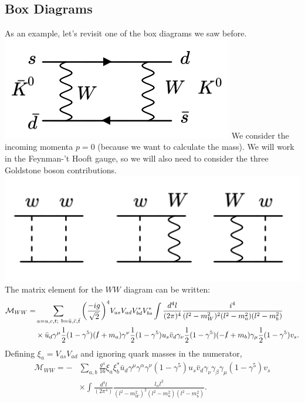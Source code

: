 \subsection{Box Diagrams}
%
As an example, let's revisit one of the box diagrams we saw before.
\newline
  \includegraphics[width=0.6\linewidth]{figs/49c.png}
\newline
We consider the incoming momenta $p=0$ (because we want to calculate the mass). We will work in the Feynman-'t Hooft gauge, so we will also need to consider the three Goldstone boson contributions.
\newline
  \includegraphics[width=0.6\linewidth]{figs/51a.png}
\newline
The matrix element for the $WW$ diagram can be written:
\begin{equation}
\begin{split}
\mathcal{M}_{WW} = &\sum_{a=u,c,t;\ b=\bar{u},\bar{c},\bar{t}} \bigg(\frac{-ig}{\sqrt{2}}\bigg)^4 V_{as}V_{ad} V^*_{bd}V^*_{bs} \int \frac{d^4l}{(2\pi)^4}\frac{i^4}{(l^2-m_W^2)^2(l^2-m_a^2)(l^2-m_b^2)} \\
&\times \bar{u}_d \gamma^\mu\frac{1}{2}(1-\gamma^5)(\slashed{l}+m_a)\gamma^\nu \frac{1}{2}(1-\gamma^5) u_s \bar{v}_d \gamma_\nu \frac{1}{2}(1-\gamma^5)(-\slashed{l}+m_b)\gamma_\mu \frac{1}{2}(1-\gamma^5)v_s.
\end{split}
\end{equation}
Defining $\xi_a = V_{as}V_{ad}$ and ignoring quark masses in the numerator,
\begin{equation}
\begin{split}
\mathcal{M}_{WW} = -&\sum_{a,b} \frac{g^4}{16} \xi_a \xi^*_b \bar{u}_d \gamma^\mu \gamma^\alpha \gamma^\nu (1-\gamma^5) u_s \bar{v}_d \gamma_\nu \gamma_\beta \gamma_\mu(1-\gamma^5)v_s \\
&\times \int \frac{d^4l}{(2\pi^4)} \frac{l_\alpha l^\beta}{(l^2-m_W^2)^2(l^2-m_a^2)(l^2-m_b^2)}. 
\end{split}
\end{equation}
